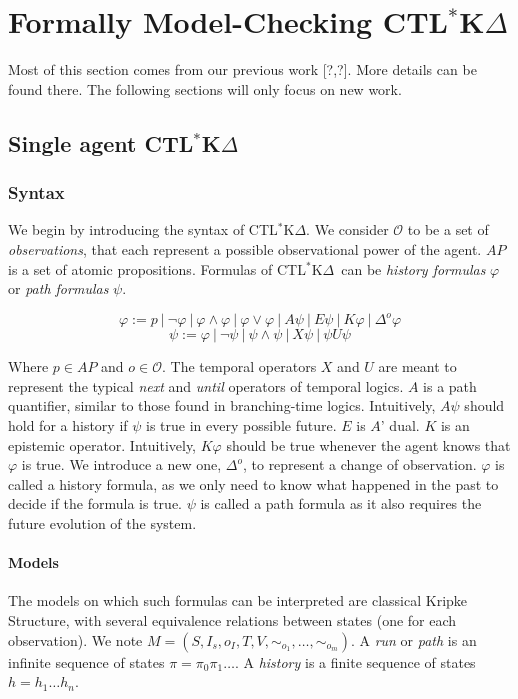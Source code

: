 \documentclass{acmart}
\def\ctlskd{CTL$^{*}$K$\Delta$}
\def\A{\mathit{A}}
\def\E{\mathit{E}}
\def\U{\mathit{U}}
\def\X{\mathit{X}}
\def\K{\mathit{K}}
\def\D#1{\Delta^{#1}}
\def\eqstate#1{\sim_{#1}}
\begin{document}
\section{Formally Model-Checking \ctlskd}
Most of this section comes from our previous work [?,?]. More details can be found there.
The following sections will only focus on new work.

\subsection{Single agent \ctlskd}
\subsubsection{Syntax}

We begin by introducing the syntax of \ctlskd. 
We consider $\mathcal{O}$ to be a set of \textit{observations}, that each represent a possible observational power of the agent. $\mathit{AP}$ is a set of atomic propositions.
Formulas of \ctlskd\ can be \textit{history formulas} $\varphi$ or \textit{path formulas} $\psi$.

$$\varphi := p ~|~ \neg \varphi ~|~ \varphi\wedge\varphi ~|~ \varphi\vee\varphi ~|~ \A\psi ~|~ \E\psi ~|~ \K\varphi ~|~ \D{o}\varphi$$
$$\psi := \varphi ~|~ \neg\psi ~|~ \psi\wedge\psi ~|~ \X\psi ~|~ \psi\U\psi$$

Where $p\in\mathit{AP}$ and $o\in\mathcal{O}$.
The temporal operators $\X$ and $\U$ are meant to represent the typical \textit{next} and \textit{until} operators of temporal logics.
$\A$ is a path quantifier, similar to those found in branching-time logics. Intuitively, $\A\psi$ should hold for a history if $\psi$ is true in every possible future. $\E$ is $\A$' dual.
$\K$ is an epistemic operator. Intuitively, $\K\varphi$ should be true whenever the agent knows that $\varphi$ is true. We introduce a new one, $\D{o}$, to represent a change of observation.
$\varphi$ is called a history formula, as we only need to know what happened in the past to decide if the formula is true. $\psi$ is called a path formula as it also requires the future evolution of the system.

\paragraph{Models}
The models on which such formulas can be interpreted are classical Kripke Structure, with several equivalence relations between states (one for each observation). We note $M=(S,I_s,o_I,T,V,\eqstate{o_1},\dots,\eqstate{o_m})$.
A \textit{run} or \textit{path} is an infinite sequence of states $\pi=\pi_0\pi_1\dots$. A \textit{history} is a finite sequence of states $h=h_1\dots h_n$.
\end{document}

